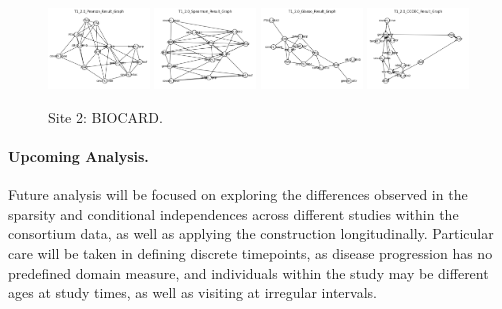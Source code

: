 \begin{figure}
    \includegraphics[width=0.24\textwidth]{diss/7_cond/figs/T1_2.0_Pearson_Result_Graph.png}
    \includegraphics[width=0.24\textwidth]{diss/7_cond/figs/T1_2.0_Spearman_Result_Graph.png}
    \includegraphics[width=0.24\textwidth]{diss/7_cond/figs/T1_2.0_Glasso_Result_Graph.png}
    \includegraphics[width=0.24\textwidth]{diss/7_cond/figs/T1_2.0_CODEC_Result_Graph.png}
    \caption{Site 2: BIOCARD.}
    \label{fig:site2}
\end{figure}

\paragraph{Upcoming Analysis.} Future analysis will be focused on exploring the differences observed in the sparsity and conditional independences across different studies within the consortium data, as well as applying the construction longitudinally. Particular care will be taken in defining discrete timepoints, as disease progression has no predefined domain measure, and individuals within the study may be different ages at study times, as well as visiting at irregular intervals.
